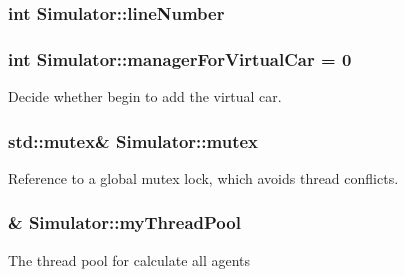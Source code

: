 \subsubsection[{\texorpdfstring{line\+Number}{lineNumber}}]{\setlength{\rightskip}{0pt plus 5cm}int Simulator\+::line\+Number\hspace{0.3cm}{\ttfamily [private]}}\hypertarget{classSimulator_aa765c0e8bded253061bf1ffb2ba6c672}{}\label{classSimulator_aa765c0e8bded253061bf1ffb2ba6c672}
\subsubsection[{\texorpdfstring{manager\+For\+Virtual\+Car}{managerForVirtualCar}}]{\setlength{\rightskip}{0pt plus 5cm}int Simulator\+::manager\+For\+Virtual\+Car = 0\hspace{0.3cm}{\ttfamily [static]}}\hypertarget{classSimulator_a288aba2bf9db7bf5e05a41cbd810e6de}{}\label{classSimulator_a288aba2bf9db7bf5e05a41cbd810e6de}
Decide whether begin to add the virtual car. 
\subsubsection[{\texorpdfstring{mutex}{mutex}}]{\setlength{\rightskip}{0pt plus 5cm}std\+::mutex\& Simulator\+::mutex\hspace{0.3cm}{\ttfamily [private]}}\hypertarget{classSimulator_a7292c6375fc98bac2acd5b183aab36fb}{}\label{classSimulator_a7292c6375fc98bac2acd5b183aab36fb}
Reference to a global mutex lock, which avoids thread conflicts. 
\subsubsection[{\texorpdfstring{my\+Thread\+Pool}{myThreadPool}}]{\& Simulator\+::my\+Thread\+Pool\hspace{0.3cm}{\ttfamily [private]}}\hypertarget{classSimulator_afd96ecff25700211fcd29f3cce0c2d18}{}\label{classSimulator_afd96ecff25700211fcd29f3cce0c2d18}
The thread pool for calculate all agents 
